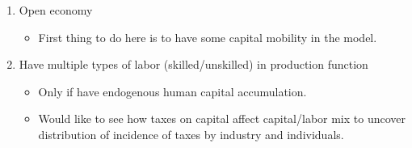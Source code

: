 \begin{enumerate}
\begin{itemize}
	\end{itemize}	
\item Open economy	
	\begin{itemize}
	\item First thing to do here is to have some capital mobility in the model.	
	\end{itemize}
\item Have multiple types of labor (skilled/unskilled) in production function	
	\begin{itemize}
	\item Only if have endogenous human capital accumulation.  
	\item Would like to see how taxes on capital affect capital/labor mix to uncover distribution of incidence of taxes by industry and individuals.	
	\end{itemize}
\end{enumerate}


